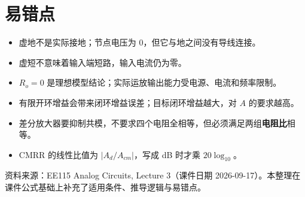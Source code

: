 \documentclass[11pt,fontset=none]{ctexart}
\begin{document}
\clearpage
\section{易错点}

\begin{itemize}
  \item 虚地不是实际接地；节点电压为 0，但它与地之间没有导线连接。
  \item 虚短不意味着输入端短路，输入电流仍为零。
  \item $R_o=0$ 是理想模型结论；实际运放输出能力受电源、电流和频率限制。
  \item 有限开环增益会带来闭环增益误差；目标闭环增益越大，对 $A$ 的要求越高。
  \item 差分放大器要抑制共模，不要求四个电阻全相等，但必须满足两组\textbf{电阻比}相等。
  \item CMRR 的线性比值为 $|A_d/A_{cm}|$，写成 dB 时才乘 $20\log_{10}$。
\end{itemize}

\vfill
{\small\color{gray}资料来源：EE115 Analog Circuits, Lecture 3（课件日期 2026-09-17）。本整理在课件公式基础上补充了适用条件、推导逻辑与易错点。}
\end{document}

